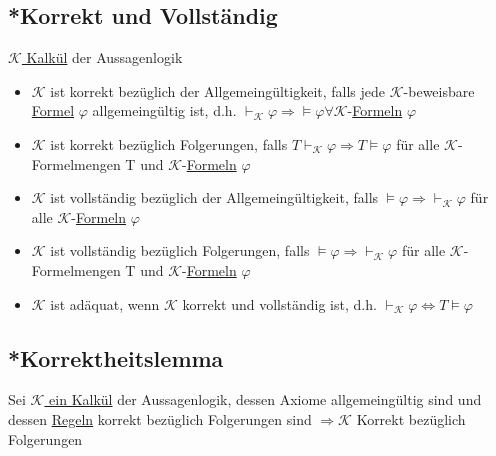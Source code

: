 \documentclass[12pt,a4paper]{article} %
\begin{document}
	\subsection{*Korrekt und Vollständig}
	\label{ALVollstandig}
	\hyperref[Kalkul]{$\mathcal{K}$ Kalkül} der Aussagenlogik
	\begin{itemize}
		\item $\mathcal{K}$ ist korrekt bezüglich der Allgemeingültigkeit, falls jede $\mathcal{K}$-beweisbare \hyperref[Formel]{Formel} $\varphi$ allgemeingültig ist, d.h. $\hyperref[Beweisbar]{\vdash_{\mathcal{K}}} \varphi \Rightarrow \hyperref[Erfullbar]{\vDash} \varphi \forall \mathcal{K}$-\hyperref[Formel]{Formeln} $\varphi$ 
		\item $\mathcal{K}$ ist korrekt bezüglich Folgerungen, falls $T \hyperref[Beweisbar]{\vdash_{\mathcal{K}}} \varphi \Rightarrow T \hyperref[Erfullbar]{\vDash} \varphi$ für alle $\mathcal{K}$-Formelmengen T und $\mathcal{K}$-\hyperref[Formel]{Formeln} $\varphi$
		\item $\mathcal{K}$ ist vollständig bezüglich der Allgemeingültigkeit, falls $\hyperref[Erfullbar]{\vDash} \varphi \Rightarrow \hyperref[Beweisbar]{\vdash_{\mathcal{K}}} \varphi$ für alle $\mathcal{K}$-\hyperref[Formel]{Formeln} $\varphi$
		\item $\mathcal{K}$ ist vollständig bezüglich Folgerungen, falls $\hyperref[Erfullbar]{\vDash} \varphi \Rightarrow \hyperref[Beweisbar]{\vdash_{\mathcal{K}}} \varphi$ für alle $\mathcal{K}$-Formelmengen T und $\mathcal{K}$-\hyperref[Formel]{Formeln} $\varphi$
		\item $\mathcal{K}$ ist adäquat, wenn $\mathcal{K}$ korrekt und vollständig ist, d.h. $\hyperref[Beweisbar]{\vdash_{\mathcal{K}}} \varphi \Leftrightarrow T \hyperref[Erfullbar]{\vDash} \varphi$
	\end{itemize}

	\subsection{*Korrektheitslemma}
	Sei \hyperref[Kalkul]{$\mathcal{K}$ ein Kalkül} der Aussagenlogik, dessen Axiome allgemeingültig sind und dessen \hyperref[Kalkul]{Regeln} korrekt bezüglich Folgerungen sind $\Rightarrow \mathcal{K}$ Korrekt bezüglich Folgerungen
	
\end{document}
